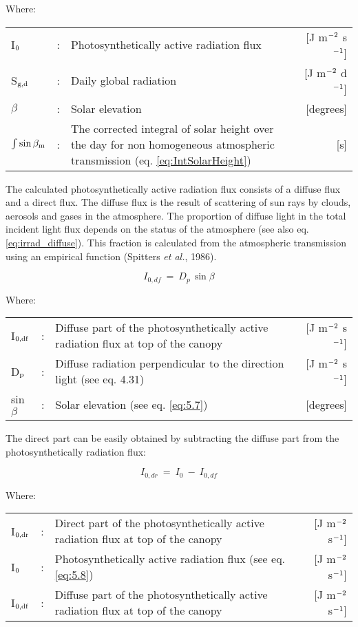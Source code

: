 Where:\\[5pt]
\begin{tabularx}{\textwidth}{llXr}
	I$_{{\rm 0}}$ &:& Photosynthetically active radiation flux    &    
	[J m$^{{\rm -2}}$ s$^{{\rm -1}}$]\\
	S$_{{\rm g,d}}$ &:& Daily global radiation   &     
	[J m$^{{\rm -2}}$ d$^{{\rm -1}}$] \\
	$\beta$ &:& Solar elevation    &    [degrees]\\
	$\int \sin \beta_{{\rm m}}$ &:& The corrected integral of solar height over the day 
	for non homogeneous atmospheric transmission (eq. \ref{eq:IntSolarHeight})   
	&     [s]\\
\end{tabularx}

The calculated photosynthetically active radiation flux consists of a diffuse flux and a
direct flux. The diffuse flux is the result of scattering of sun rays by clouds, aerosols and
gases in the atmosphere. The proportion of diffuse light in the total incident light flux
depends on the status of the atmosphere (see also eq. \ref{eq:irrad_diffuse}). This fraction 
is calculated from the atmospheric transmission using an empirical function (Spitters 
{\it et al.}, 1986).

\begin{equation}
I_{0,df} ~=~ D _{p~} \sin \beta
\end{equation}

Where:\\[5pt]
\begin{tabularx}{\textwidth}{llXr}
	I$_{{\rm 0,df}}$ &:& Diffuse part of the photosynthetically active radiation flux 
	at top of the canopy    &    [J m$^{{\rm -2}}$ s$^{{\rm -1}}$]\\
	D$_{{\rm p}}$ &:& Diffuse radiation perpendicular to the direction 
	light (see eq. 4.31)    &    [J m$^{{\rm -2}}$ s$^{{\rm -1}}$]\\
	sin$\beta$ &:& Solar elevation (see eq. \ref{eq:5.7})    &    [degrees]\\
\end{tabularx}

The direct part can be easily obtained by subtracting the diffuse part from the
photosynthetically radiation flux:

\begin{equation}
I_{0,dr} ~=~ I_{0} ~-~I_{0,df} 
\end{equation}

Where:\\[5pt]
\begin{tabularx}{\textwidth}{llXr}
	I$_{{\rm 0,dr}}$ &:& Direct part of the photosynthetically active radiation flux 
	at top of the canopy    &    [J m$^{{\rm -2}}$ s$^{{\rm -1}}$]\\
	I$_{{\rm 0}}$ &:& Photosynthetically active radiation flux (see eq. \ref{eq:5.8})    &  
	[J m$^{{\rm -2}}$ s$^{{\rm -1}}$]\\
	I$_{{\rm 0,df}}$ &:& Diffuse part of the photosynthetically active radiation flux 
	at top of the canopy     &   [J m$^{{\rm -2}}$ s$^{{\rm -1}}$]\\
\end{tabularx}

